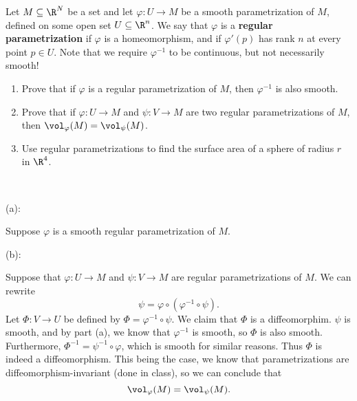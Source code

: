 \documentclass{../../../tex-setup/eh-homework}
\begin{document}
    \begin{question}{39}
        Let $M\subseteq\R^N$ be a set and let $\varphi:U\rightarrow M$ be a smooth parametrization of $M$, defined on some open set $U\subseteq \R^n$. We say that $\varphi$ is a \textbf{regular parametrization} if $\varphi$ is a homeomorphism, and if $\varphi'(p)$ has rank $n$ at every point $p\in U$. Note that we require $\varphi^{-1}$ to be continuous, but not necessarily smooth!

    \begin{enumerate}[label=(\alph*)]
        \item Prove that if $\varphi$ is a regular parametrization of $M$, then $\varphi^{-1}$ is also smooth.
        
        \item Prove that if $\varphi:U\rightarrow M$ and $\psi:V\rightarrow M$ are two regular parametrizations of $M$, then $\vol_\varphi(M)=\vol_\psi(M)$.

        \item Use regular parametrizations to find the surface area of a sphere of radius $r$ in $\R^4$.
    \end{enumerate}
    \tcblower
    \ 

    (a):

    Suppose \(\varphi\) is a smooth regular parametrization of \(M\).

    \medskip

    (b):

    Suppose that \(\varphi : U \to M\) and \(\psi : V \to M\) are regular parametrizations of \(M\). We can rewrite
    \[
        \psi = \varphi \circ \left(\varphi^{-1} \circ \psi\right).
    \]
    Let \(\Phi : V \to U\) be defined by \(\Phi = \varphi^{-1} \circ \psi\). We claim that \(\Phi\) is a diffeomorphim. \(\psi\) is smooth, and by part (a), we know that \(\varphi^{-1}\) is smooth, so \(\Phi\) is also smooth. Furthermore, \(\Phi^{-1} = \psi^{-1} \circ \varphi\), which is smooth for similar reasons. Thus \(\Phi\) is indeed a diffeomorphism. This being the case, we know that parametrizations are diffeomorphism-invariant (done in class), so we can conclude that
    \[
        \vol _{\varphi}(M) = \vol _{\psi}(M).
    \]
    \end{question}
\end{document}
